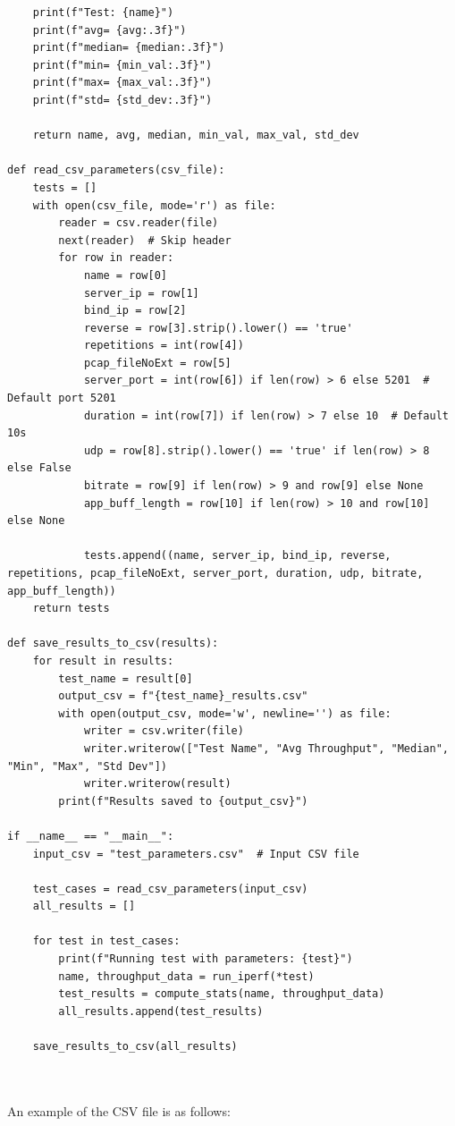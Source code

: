 \begin{verbatim}
    print(f"Test: {name}")
    print(f"avg= {avg:.3f}")
    print(f"median= {median:.3f}")
    print(f"min= {min_val:.3f}")
    print(f"max= {max_val:.3f}")
    print(f"std= {std_dev:.3f}")
    
    return name, avg, median, min_val, max_val, std_dev

def read_csv_parameters(csv_file):
    tests = []
    with open(csv_file, mode='r') as file:
        reader = csv.reader(file)
        next(reader)  # Skip header
        for row in reader:
            name = row[0]
            server_ip = row[1]
            bind_ip = row[2]
            reverse = row[3].strip().lower() == 'true'
            repetitions = int(row[4])
            pcap_fileNoExt = row[5]
            server_port = int(row[6]) if len(row) > 6 else 5201  # Default port 5201
            duration = int(row[7]) if len(row) > 7 else 10  # Default 10s
            udp = row[8].strip().lower() == 'true' if len(row) > 8 else False
            bitrate = row[9] if len(row) > 9 and row[9] else None
            app_buff_length = row[10] if len(row) > 10 and row[10] else None
            
            tests.append((name, server_ip, bind_ip, reverse, repetitions, pcap_fileNoExt, server_port, duration, udp, bitrate, app_buff_length))
    return tests

def save_results_to_csv(results):
    for result in results:
        test_name = result[0]
        output_csv = f"{test_name}_results.csv"
        with open(output_csv, mode='w', newline='') as file:
            writer = csv.writer(file)
            writer.writerow(["Test Name", "Avg Throughput", "Median", "Min", "Max", "Std Dev"])
            writer.writerow(result)
        print(f"Results saved to {output_csv}")

if __name__ == "__main__":
    input_csv = "test_parameters.csv"  # Input CSV file
    
    test_cases = read_csv_parameters(input_csv)
    all_results = []
    
    for test in test_cases:
        print(f"Running test with parameters: {test}")
        name, throughput_data = run_iperf(*test)
        test_results = compute_stats(name, throughput_data)
        all_results.append(test_results)
    
    save_results_to_csv(all_results)
\end{verbatim}

\hfill\\
\hfill\\
An example of the CSV file is as follows:

